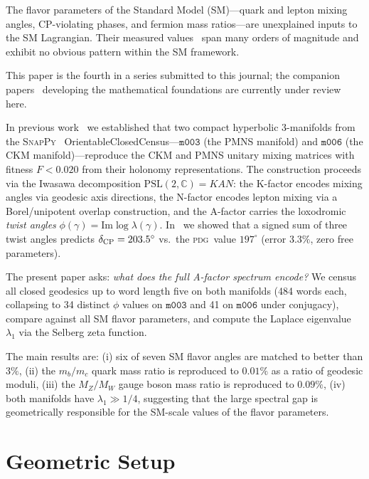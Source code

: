 \documentclass[preprint,12pt,number]{elsarticle}
\newcommand{\PSL}{\mathrm{PSL}(2,\mathbb{C})}
\newcommand{\mfld}[1]{\texttt{#1}}
\newcommand{\degr}{^{\circ}}
\newcommand{\PDG}{\textsc{pdg}}
\begin{document}
The flavor parameters of the Standard Model (SM)---quark and lepton mixing
angles, CP-violating phases, and fermion mass ratios---are unexplained inputs
to the SM Lagrangian.
Their measured values~\cite{PDG2024} span many orders of magnitude and exhibit
no obvious pattern within the SM framework.

This paper is the fourth in a series submitted to this journal; the companion papers~\cite{GentryNPB1,GentryNPB2,GentryNPB3} developing the mathematical foundations are currently under review here.

In previous work~\cite{GentryCKM,GentryPMNS,GentryCP} we established that
two compact hyperbolic 3-manifolds from the \textsc{SnapPy}~\cite{SnapPy}
OrientableClosedCensus---$\mfld{m003}$ (the PMNS manifold) and $\mfld{m006}$
(the CKM manifold)---reproduce the CKM and PMNS unitary mixing matrices with
fitness $F < 0.020$ from their holonomy representations.
The construction proceeds via the Iwasawa decomposition
$\PSL = KAN$: the K-factor encodes mixing angles via geodesic axis directions,
the N-factor encodes lepton mixing via a Borel/unipotent overlap construction,
and the A-factor carries the loxodromic \emph{twist angles}
$\phi(\gamma) = \mathrm{Im}\log\lambda(\gamma)$.
In~\cite{GentryCP} we showed that a signed sum of three twist angles predicts
$\delta_{\rm CP} = 203.5\degr$ vs.\ the \PDG\ value $197\degr$ (error $3.3\%$,
zero free parameters).

The present paper asks: \emph{what does the full A-factor spectrum encode?}
We census all closed geodesics up to word length five on both manifolds
(484 words each, collapsing to 34 distinct $\phi$ values on $\mfld{m003}$
and 41 on $\mfld{m006}$ under conjugacy), compare against all SM flavor
parameters, and compute the Laplace eigenvalue $\lambda_1$ via the Selberg
zeta function.

The main results are:
(i) six of seven SM flavor angles are matched to better than $3\%$,
(ii) the $m_b/m_c$ quark mass ratio is reproduced to $0.01\%$ as a ratio of
geodesic moduli,
(iii) the $M_Z/M_W$ gauge boson mass ratio is reproduced to $0.09\%$,
(iv) both manifolds have $\lambda_1 \gg 1/4$, suggesting that the large spectral
gap is geometrically responsible for the SM-scale values of the flavor parameters.

\section{Geometric Setup}
\label{sec:setup}
\end{document}

